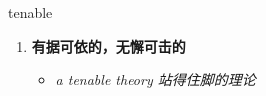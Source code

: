 
\begin{frame}
{\huge tenable}
\begin{center}
\begin{enumerate}\Large
  \item \textbf{有据可依的，无懈可击的}
  \begin{itemize}
    \item \em{\Large{a tenable theory 站得住脚的理论}}
  \end{itemize}
\end{enumerate}
\end{center}
\end{frame}
